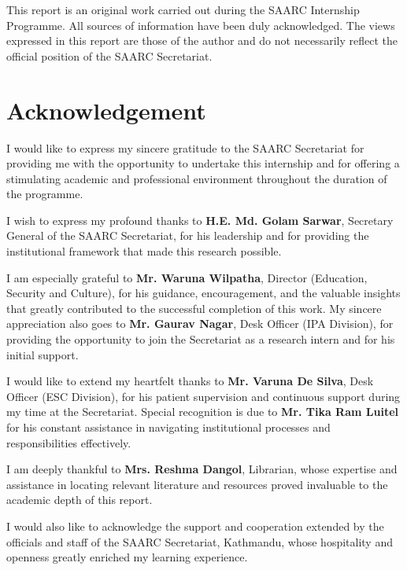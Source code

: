\documentclass[12pt,a4paper]{report}
\begin{document}
This report is an original work carried out during the SAARC Internship Programme. All sources of information have been duly acknowledged. The views expressed in this report are those of the author and do not necessarily reflect the official position of the SAARC Secretariat.

\newpage

\chapter*{Acknowledgement}


I would like to express my sincere gratitude to the SAARC Secretariat for providing me with the opportunity to undertake this internship and for offering a stimulating academic and professional environment throughout the duration of the programme.

I wish to express my profound thanks to \textbf{H.E. Md. Golam Sarwar}, Secretary General of the SAARC Secretariat, for his leadership and for providing the institutional framework that made this research possible.

I am especially grateful to \textbf{Mr. Waruna Wilpatha}, Director (Education, Security and Culture), for his guidance, encouragement, and the valuable insights that greatly contributed to the successful completion of this work. My sincere appreciation also goes to \textbf{Mr. Gaurav Nagar}, Desk Officer (IPA Division), for providing the opportunity to join the Secretariat as a research intern and for his initial support.

I would like to extend my heartfelt thanks to \textbf{Mr. Varuna De Silva}, Desk Officer (ESC Division), for his patient supervision and continuous support during my time at the Secretariat. Special recognition is due to \textbf{Mr. Tika Ram Luitel} for his constant assistance in navigating institutional processes and responsibilities effectively.

I am deeply thankful to \textbf{Mrs. Reshma Dangol}, Librarian, whose expertise and assistance in locating relevant literature and resources proved invaluable to the academic depth of this report.

I would also like to acknowledge the support and cooperation extended by the officials and staff of the SAARC Secretariat, Kathmandu, whose hospitality and openness greatly enriched my learning experience.
\end{document}
